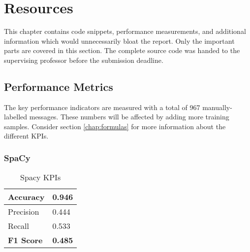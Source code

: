\chapter{Resources}

This chapter contains code snippets, performance measurements, and additional information which would unnecessarily bloat the report. Only the important parts are covered in this section. The complete source code was handed to the supervising professor before the submission deadline.

\section{Performance Metrics}

The key performance indicators are measured with a total of 967 manually-labelled messages. These numbers will be affected by adding more training samples. Consider section \ref{chap:formulas} for more information about the different KPIs.

\subsection{SpaCy}

\begin{table}[ht!]
    \centering
    \begin{tabular}{|p{6em}|p{3em}|}
        \hline
        Accuracy & 0.946 \\
        \hline
        Precision & 0.444 \\
        \hline
        Recall & 0.533 \\
        \hline
        \textbf{F1 Score} & \textbf{0.485} \\
        \hline
    \end{tabular}
    \caption{Spacy KPIs}
    \label{tbl:perf-spacy}
\end{table}

